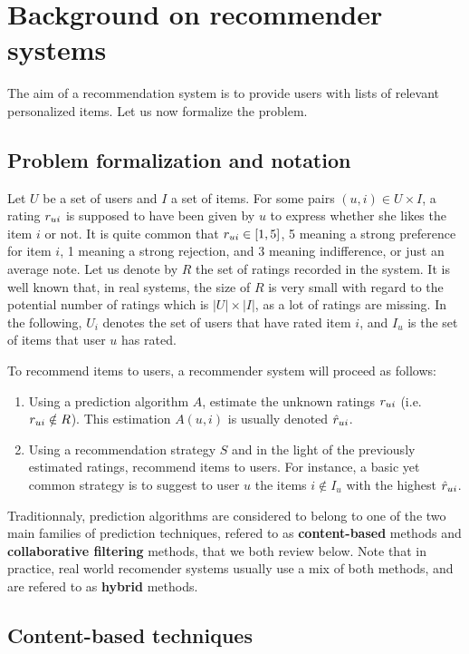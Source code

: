 \section{Background on recommender systems}
\label{sec:background_RS}

The aim of a recommendation system is to provide users with lists of relevant
personalized items.  Let us now formalize the problem.

\subsection{Problem formalization and notation}
Let $U$ be a set of users and $I$ a set of items. For some pairs $(u,i) \in U
\times I$, a rating  $r_{ui}$ is supposed to have been given by $u$ to express
whether she likes the item $i$ or not.
It is quite common that  $r_{ui} \in [1, 5]$, 5 meaning a strong preference for
item $i$, 1 meaning a strong rejection, and 3 meaning indifference, or just an
average note.  Let us denote by $R$ the set of ratings recorded in the system. It
is well known that, in real systems, the size of $R$ is very small with regard
to the potential number of ratings which is $|U| \times |I|$, as a lot of
ratings are missing. In the following, $U_i$ denotes the set of users that have
rated item $i$, and $I_u$ is the set of items that
user $u$ has rated.

To recommend items to users, a recommender system will proceed as follows:
\begin{enumerate}
\item Using a prediction algorithm $A$, estimate the unknown ratings $r_{ui}$
(i.e. $r_{ui} \notin R$). This estimation $A(u, i)$ is usually denoted
$\hat{r}_{ui}$.
\item Using a recommendation strategy $S$ and in the light of the previously
estimated ratings, recommend items to users. For instance, a basic yet
common strategy is to suggest to user $u$ the items $i \notin I_u$ with the
highest $\hat{r}_{ui}$.
\end{enumerate}

Traditionnaly, prediction algorithms are considered to belong to one of the two
main families of prediction techniques, refered to as \textbf{content-based}
methods and \textbf{collaborative filtering} methods, that we both review
below. Note that in practice, real world recomender systems usually use a mix
of both methods, and are refered to as \textbf{hybrid} methods.

\subsection{Content-based techniques}
\label{sec:content-based}


